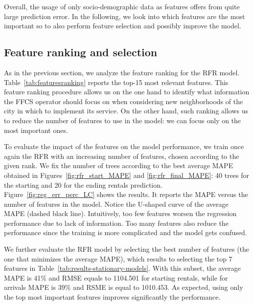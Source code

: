 Overall, the usage of only socio-demographic data as features offers from quite large prediction error. In the following, we look into which features are the most important so to also perform feature selection and possibly improve the model.

\subsection{Feature ranking and selection}

As in the previous section, we analyze the feature ranking for the RFR model. 
Table~\ref{tab:featuresranking} reports the top-15 most relevant features. 
This feature ranking procedure allows us on the one hand to identify what information the FFCS operator should focus on when considering new neighborhoods of the city in which to implement its service. 
On the other hand, such ranking allows us to reduce the number of features to use in the model: we can focus only on the most important ones.

To evaluate the impact of the features on the model performance, we train once again the RFR with an increasing number of features, chosen according to the given rank. We fix the number of trees according to the best average MAPE obtained in Figures~\ref{fig:rfr_start_MAPE} and \ref{fig:rfr_final_MAPE}: 40 trees for the starting and 20 for the ending rentals prediction. Figure~\ref{fig:reg_err_perc_LC} shows the results. It reports the MAPE versus the number of features in the model.
Notice the U-shaped curve of the average MAPE (dashed black line). Intuitively, too few features worsen the regression performance due to lack of information. Too many features also reduce the performance since the training is more complicated and the model gets confused.

We further evaluate the RFR model by selecting the best number of features (the one that minimizes the average MAPE), which results to selecting the top 7 features in Table~\ref{tab:results-stationary-models}. With this subset, the average MAPE is 41\% and RMSE equals to 1104.501 for starting rentals, while for arrivals
MAPE is 39\% and  RSME is equal to 1010.453.%
As expected, using only the top most important features improves significantly the performance.

